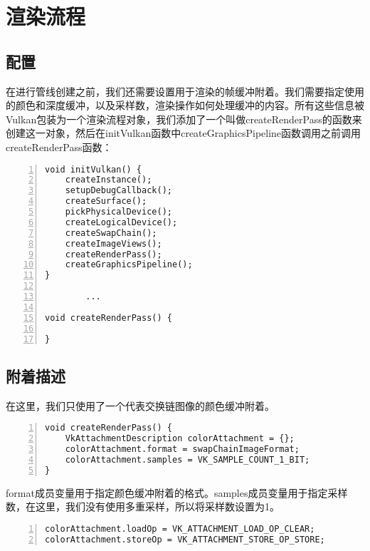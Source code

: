 \documentclass{ctexart}
\begin{document}
\section{渲染流程}

\subsection{配置}

在进行管线创建之前，我们还需要设置用于渲染的帧缓冲附着。我们需要指定使用的颜色和深度缓冲，以及采样数，渲染操作如何处理缓冲的内容。所有这些信息被Vulkan包装为一个渲染流程对象，我们添加了一个叫做createRenderPass的函数来创建这一对象，然后在initVulkan函数中createGraphicsPipeline函数调用之前调用createRenderPass函数：

\begin{lstlisting}[language={[ANSI]C},keywordstyle=\color{blue!70},commentstyle=\color{red!50!green!50!blue!50},frame=shadowbox, rulesepcolor=\color{red!20!green!20!blue!20},basicstyle=\small,numbers=left, numberstyle=\tiny,breaklines=true]
void initVulkan() {
	createInstance();
	setupDebugCallback();
	createSurface();
	pickPhysicalDevice();
	createLogicalDevice();
	createSwapChain();
	createImageViews();
	createRenderPass();
	createGraphicsPipeline();
}

		...

void createRenderPass() {

}
\end{lstlisting}

\subsection{附着描述}

在这里，我们只使用了一个代表交换链图像的颜色缓冲附着。

\begin{lstlisting}[language={[ANSI]C},keywordstyle=\color{blue!70},commentstyle=\color{red!50!green!50!blue!50},frame=shadowbox, rulesepcolor=\color{red!20!green!20!blue!20},basicstyle=\small,numbers=left, numberstyle=\tiny,breaklines=true]
void createRenderPass() { 
	VkAttachmentDescription colorAttachment = {};
	colorAttachment.format = swapChainImageFormat;
	colorAttachment.samples = VK_SAMPLE_COUNT_1_BIT;
}
\end{lstlisting}

format成员变量用于指定颜色缓冲附着的格式。samples成员变量用于指定采样数，在这里，我们没有使用多重采样，所以将采样数设置为1。

\begin{lstlisting}[language={[ANSI]C},keywordstyle=\color{blue!70},commentstyle=\color{red!50!green!50!blue!50},frame=shadowbox, rulesepcolor=\color{red!20!green!20!blue!20},basicstyle=\small,numbers=left, numberstyle=\tiny,breaklines=true]
colorAttachment.loadOp = VK_ATTACHMENT_LOAD_OP_CLEAR;
colorAttachment.storeOp = VK_ATTACHMENT_STORE_OP_STORE;
\end{lstlisting}
\end{document}
